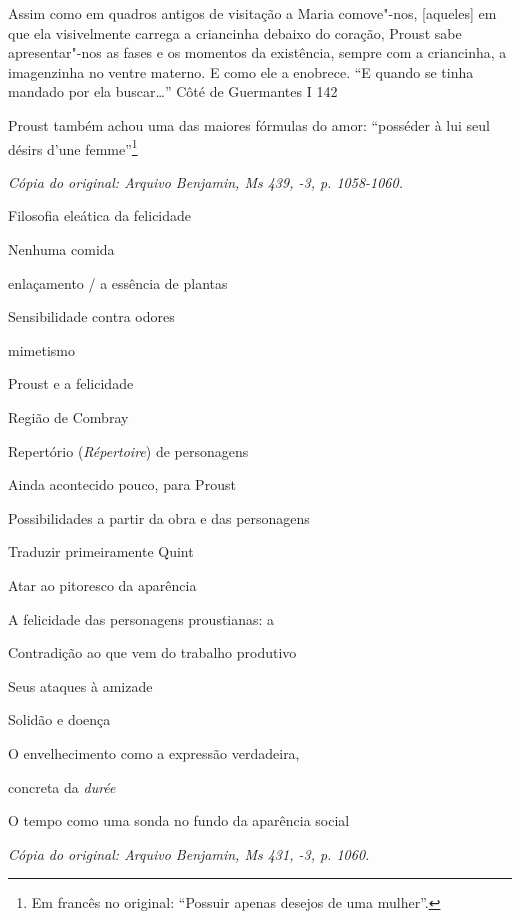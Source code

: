 Assim como em quadros antigos de visitação a Maria comove"-nos,
{[}aqueles{]} em que ela visivelmente carrega a criancinha debaixo do
coração, Proust sabe apresentar"-nos as fases e os momentos da
existência, sempre com a criancinha, a imagenzinha no ventre materno. E
como ele a enobrece. ``E quando se tinha mandado por ela buscar\ldots{}''
Côté de Guermantes I 142

Proust também achou uma das maiores fórmulas do amor: ``posséder à lui
seul désirs d'une femme''\footnote{Em francês no original:
  ``Possuir apenas desejos de uma mulher''. \versal{[N. T.]}}

\begin{flushright}
\emph{\small{Cópia do original: Arquivo Benjamin, Ms 439, -3, p. 1058-1060.}}
\end{flushright}

Filosofia eleática da felicidade

Nenhuma comida

enlaçamento / a essência de plantas

Sensibilidade contra odores

mimetismo

Proust e a felicidade

Região de Combray

Repertório (\emph{Répertoire}) de personagens

Ainda acontecido pouco, para Proust

Possibilidades a partir da obra e das personagens

Traduzir primeiramente Quint

Atar ao pitoresco da aparência

A felicidade das personagens proustianas: a

Contradição ao que vem do trabalho produtivo

Seus ataques à amizade

Solidão e doença

O envelhecimento como a expressão verdadeira,

concreta da \emph{durée}
  
O tempo como uma sonda no fundo da aparência social


\begin{flushright}
\emph{\small{Cópia do original: Arquivo Benjamin, Ms 431, -3, p. 1060.}}
\end{flushright}

